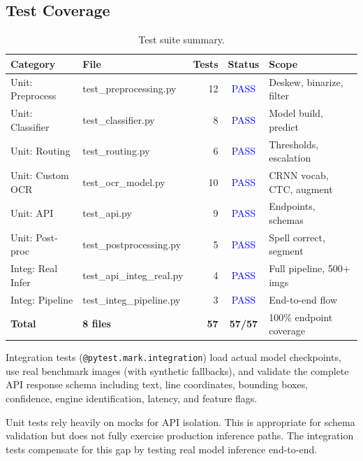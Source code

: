 \documentclass[12pt,a4paper]{article}
\begin{document}
\subsection{Test Coverage}

\begin{table}[H]
  \centering
  \small
  \begin{tabular}{llrcl}
    \toprule
    \textbf{Category} & \textbf{File} & \textbf{Tests}
    & \textbf{Status} & \textbf{Scope} \\
    \midrule
    Unit: Preprocess   & test\_preprocessing.py   & 12
    & \textcolor{blue}{PASS} & Deskew, binarize, filter \\
    Unit: Classifier   & test\_classifier.py      & 8
    & \textcolor{blue}{PASS} & Model build, predict \\
    Unit: Routing      & test\_routing.py         & 6
    & \textcolor{blue}{PASS} & Thresholds, escalation \\
    Unit: Custom OCR   & test\_ocr\_model.py      & 10
    & \textcolor{blue}{PASS} & CRNN vocab, CTC, augment \\
    Unit: API          & test\_api.py             & 9
    & \textcolor{blue}{PASS} & Endpoints, schemas \\
    Unit: Post-proc    & test\_postprocessing.py  & 5
    & \textcolor{blue}{PASS} & Spell correct, segment \\
    \midrule
    Integ: Real Infer  & test\_api\_integ\_real.py & 4
    & \textcolor{blue}{PASS} & Full pipeline, 500+ imgs \\
    Integ: Pipeline    & test\_integ\_pipeline.py & 3
    & \textcolor{blue}{PASS} & End-to-end flow \\
    \midrule
    \textbf{Total} & \textbf{8 files} & \textbf{57}
    & \textbf{57/57} & 100\% endpoint coverage \\
    \bottomrule
  \end{tabular}
  \caption{Test suite summary.}
\end{table}

Integration tests (\texttt{@pytest.mark.integration}) load actual
model checkpoints, use real benchmark images (with synthetic
fallbacks), and validate the complete API response schema including
text, line coordinates, bounding boxes, confidence, engine
identification, latency, and feature flags.

Unit tests rely heavily on mocks for API isolation. This is
appropriate for schema validation but does not fully exercise
production inference paths. The integration tests compensate for this
gap by testing real model inference end-to-end.
\end{document}
